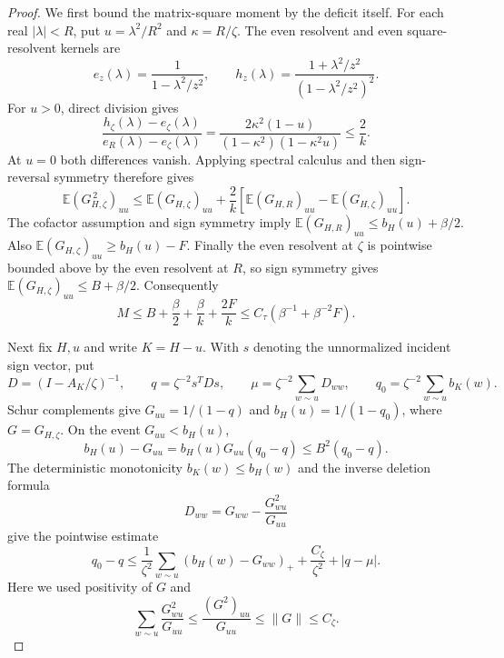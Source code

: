 \documentclass[11pt]{article}
\numberwithin{equation}{section}
\begin{document}
\begin{proof}
We first bound the matrix-square moment by the deficit itself.
For each real $|\lambda|<R$, put $u=\lambda^2/R^2$ and
$\kappa=R/\zeta$. The even resolvent and even square-resolvent
kernels are
\[
 e_z(\lambda)=\frac1{1-\lambda^2/z^2},\qquad
 h_z(\lambda)=\frac{1+\lambda^2/z^2}{(1-\lambda^2/z^2)^2}.
\]
For $u>0$, direct division gives
\[
 \frac{h_\zeta(\lambda)-e_\zeta(\lambda)}
      {e_R(\lambda)-e_\zeta(\lambda)}
 =\frac{2\kappa^2(1-u)}{(1-\kappa^2)(1-\kappa^2u)}
 \le\frac2k.
\]
At $u=0$ both differences vanish. Applying spectral calculus and
then sign-reversal symmetry therefore gives
\begin{equation}\label{eq:ward-bootstrap}
 \mathbb E(G_{H,\zeta}^{\,2})_{uu}
 \le \mathbb E(G_{H,\zeta})_{uu}
   +\frac2k\left[\mathbb E(G_{H,R})_{uu}
                      -\mathbb E(G_{H,\zeta})_{uu}\right].
\end{equation}
The cofactor assumption and sign symmetry imply
$\mathbb E(G_{H,R})_{uu}\le b_H(u)+\beta/2$.
Also $\mathbb E(G_{H,\zeta})_{uu}\ge b_H(u)-F$.
Finally the even resolvent at $\zeta$ is pointwise bounded above
by the even resolvent at $R$, so sign symmetry gives
$\mathbb E(G_{H,\zeta})_{uu}\le B+\beta/2$.
Consequently
\begin{equation}\label{eq:second-moment-self-bound}
 M\le B+\frac\beta2+\frac\beta k+\frac{2F}{k}
   \le C_\tau\left(\beta^{-1}+\beta^{-2}F\right).
\end{equation}

Next fix $H,u$ and write $K=H-u$. With $s$ denoting the unnormalized
incident sign vector, put
\[
 D=(I-A_K/\zeta)^{-1},\qquad
 q=\zeta^{-2}s^TDs,\qquad
 \mu=\zeta^{-2}\sum_{w\sim u}D_{ww},\qquad
 q_0=\zeta^{-2}\sum_{w\sim u}b_K(w).
\]
Schur complements give $G_{uu}=1/(1-q)$ and
$b_H(u)=1/(1-q_0)$, where $G=G_{H,\zeta}$.
On the event $G_{uu}<b_H(u)$,
\[
 b_H(u)-G_{uu}=b_H(u)G_{uu}(q_0-q)
               \le B^2(q_0-q).
\]
The deterministic monotonicity $b_K(w)\le b_H(w)$ and the inverse
deletion formula
\[
 D_{ww}=G_{ww}-\frac{G_{wu}^2}{G_{uu}}
\]
give the pointwise estimate
\[
 q_0-q\le\frac1{\zeta^2}
             \sum_{w\sim u}(b_H(w)-G_{ww})_+
           +\frac{C_\zeta}{\zeta^2}+|q-\mu|.
\]
Here we used positivity of $G$ and
\[
 \sum_{w\sim u}\frac{G_{wu}^2}{G_{uu}}
 \le\frac{(G^2)_{uu}}{G_{uu}}\le\|G\|\le C_\zeta.
\]


\end{proof}
\end{document}
